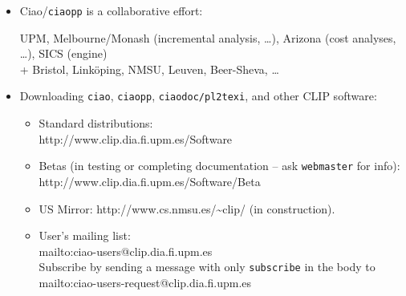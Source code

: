 \documentclass{article}
\renewcommand{\_}{\char'137}
\begin{document}
\begin{itemize}
\item Ciao/\texttt{ciaopp} is a collaborative effort:

     UPM, Melbourne/Monash (incremental analysis, \ldots), Arizona
     (cost  analyses, \ldots), SICS (engine) \\
     + Bristol, Link\"{o}ping, NMSU, Leuven, Beer-Sheva, \ldots 

\item Downloading \texttt{ciao}, \texttt{ciaopp},
  \texttt{ciaodoc/pl2texi}, and other CLIP software:
\begin{itemize}
  \item Standard distributions:\\  
                       {http://www.clip.dia.fi.upm.es/Software}

  \item Betas (in testing or completing documentation --
    ask {\tt webmaster} for info): \\ 
                       {http://www.clip.dia.fi.upm.es/Software/Beta}
  \item US Mirror: 
                       {http://www.cs.nmsu.es/\~{}clip/}
     (in construction).

  \item User's mailing list: \\
                       {mailto:ciao-users@clip.dia.fi.upm.es} \\
        Subscribe by sending a message with only \texttt{subscribe} in
        the body to \\
                       {mailto:ciao-users-request@clip.dia.fi.upm.es} 
\end{itemize}

\end{itemize}


\newpage
\renewcommand{\refname}{Recent Bibliography on the ciaopp System Components}
{\normalsize


}
\end{document}
